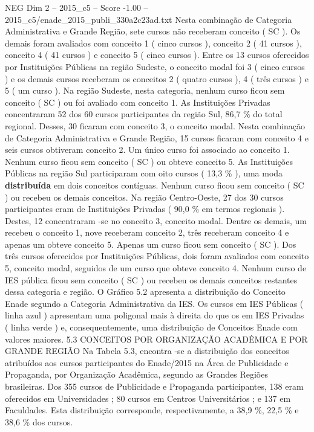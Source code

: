 \begin{textsample}{NEG Dim 2 – 2015\_c5 – Score -1.00 – 2015\_c5/enade\_2015\_publi\_330a2c23ad.txt}
Nesta combinação de Categoria Administrativa e Grande Região, sete cursos não receberam conceito ( SC ).
Os demais foram avaliados com conceito 1 ( cinco cursos ), conceito 2 ( 41 cursos ), conceito 4 ( 41 cursos ) e conceito 5 ( cinco cursos ).
Entre os 13 cursos oferecidos por Instituições Públicas na região Sudeste, o conceito modal foi 3 ( cinco cursos ) e os demais cursos receberam os conceitos 2 ( quatro cursos ), 4 ( três cursos ) e 5 ( um curso ).
Na região Sudeste, nesta categoria, nenhum curso ficou sem conceito ( SC ) ou foi avaliado com conceito 1.
As Instituições Privadas concentraram 52 dos 60 cursos participantes da região Sul, 86,7 \% do total regional.
Desses, 30 ficaram com conceito 3, o conceito modal.
Nesta combinação de Categoria Administrativa e Grande Região, 15 cursos ficaram com conceito 4 e seis cursos obtiveram conceito 2.
Um único curso foi associado ao conceito 1.
Nenhum curso ficou sem conceito ( SC ) ou obteve conceito 5.
As Instituições Públicas na região Sul participaram com oito cursos ( 13,3 \% ), uma moda \textbf{distribuída} em dois conceitos contíguas.
Nenhum curso ficou sem conceito ( SC ) ou recebeu os demais conceitos.
Na região Centro-Oeste, 27 dos 30 cursos participantes eram de Instituições Privadas ( 90,0 \% em termos regionais ).
Destes, 12 concentraram -se no conceito 3, conceito modal.
Dentre os demais, um recebeu o conceito 1, nove receberam conceito 2, três receberam conceito 4 e apenas um obteve conceito 5.
Apenas um curso ficou sem conceito ( SC ).
Dos três cursos oferecidos por Instituições Públicas, dois foram avaliados com conceito 5, conceito modal, seguidos de um curso que obteve conceito 4.
Nenhum curso de IES pública ficou sem conceito ( SC ) ou recebeu os demais conceitos restantes dessa categoria e região.
O Gráfico 5.2 apresenta a distribuição do Conceito Enade segundo a Categoria Administrativa da IES.
Os cursos em IES Públicas ( linha azul ) apresentam uma poligonal mais à direita do que os em IES Privadas ( linha verde ) e, consequentemente, uma distribuição de Conceitos Enade com valores maiores. 5.3 CONCEITOS POR ORGANIZAÇÃO ACADÊMICA E POR GRANDE REGIÃO Na Tabela 5.3, encontra -se a distribuição dos conceitos atribuídos aos cursos participantes do Enade/2015 na Área de Publicidade e Propaganda, por Organização Acadêmica, segundo as Grandes Regiões brasileiras.
Dos 355 cursos de Publicidade e Propaganda participantes, 138 eram oferecidos em Universidades ; 80 cursos em Centros Universitários ; e 137 em Faculdades.
Esta distribuição corresponde, respectivamente, a 38,9 \%, 22,5 \% e 38,6 \% dos cursos.

\end{textsample}
